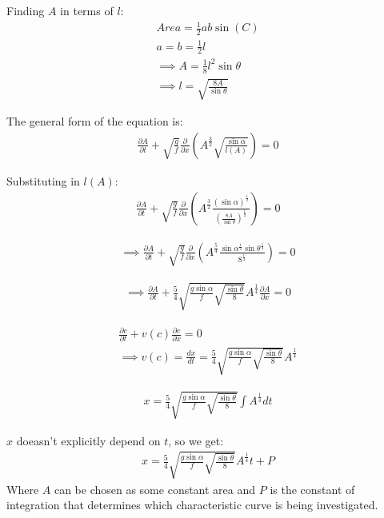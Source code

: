 \documentclass[11pt]{article}
\begin{document}
Finding $A$ in terms of $l$:
\begin{align}
    Area = \frac{1}{2}ab\sin(C)
    \\a = b = \frac{1}{2}l
    \\\implies A = \frac{1}{8}l^2\sin{\theta}
    \\\implies l = \sqrt{\frac{8A}{\sin{\theta}}}
\end{align}

The general form of the equation is:
\begin{align}
    \frac{\partial A}{\partial t}+ \sqrt{\frac{g}{f}}\frac{\partial}{\partial x}\left(A^{\frac{3}{2}}\sqrt{\frac{\sin{\alpha}}{l(A)}}\right) = 0
\end{align}

Substituting in $l(A)$:
\begin{align}
    \frac{\partial A}{\partial t}+ \sqrt{\frac{g}{f}}\frac{\partial}{\partial x}\left(A^{\frac{3}{2}} \frac{(\sin{\alpha})^{\frac{1}{2}}}{\left({\frac{8A}{\sin{\theta}}}\right)^\frac{1}{4}} \right) = 0
\end{align}

\begin{align}
    \implies \frac{\partial A}{\partial t}+ \sqrt{\frac{g}{f}}\frac{\partial}{\partial x} \left(A^{\frac{5}{4}} \frac{\sin{\alpha}^{\frac{1}{2}}\sin{\theta}^\frac{1}{4}}{8^\frac{1}{4}} \right)= 0
\end{align}

\begin{align}
    \implies \frac{\partial A}{\partial t}+ \frac{5}{4}\sqrt{\frac{g\sin{\alpha}}{f}\sqrt{\frac{\sin{\theta}}{8}}}A^\frac{1}{4} \frac{\partial A}{\partial x} = 0
\end{align}

\begin{align}
    \frac{\partial c}{\partial t} + v(c) \frac{\partial c}{\partial x} = 0
    \\\implies v(c) = \frac{dx}{dt} = \frac{5}{4}\sqrt{\frac{g\sin{\alpha}}{f}\sqrt{\frac{\sin{\theta}}{8}}} A^\frac{1}{4}
\end{align}

\begin{align}
    x = \frac{5}{4}\sqrt{\frac{g\sin{\alpha}}{f}\sqrt{\frac{\sin{\theta}}{8}}} \int A^\frac{1}{4} dt
\end{align}

$x$ doeasn't explicitly depend on $t$, so we get:
\begin{align}
    x = \frac{5}{4}\sqrt{\frac{g\sin{\alpha}}{f}\sqrt{\frac{\sin{\theta}}{8}}} A^\frac{1}{4} t + P
\end{align}
Where $A$ can be chosen as some constant area and $P$ is the constant of integration that determines which characteristic curve is being investigated.
\end{document}
